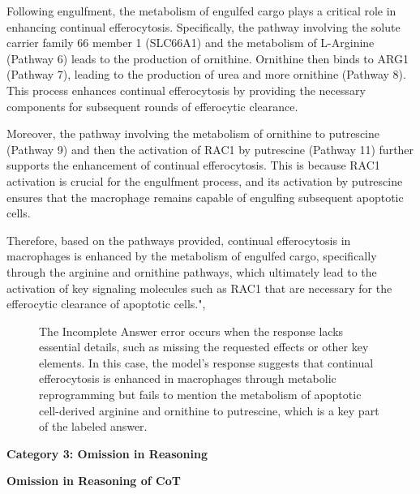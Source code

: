 \begin{tcolorbox}[breakable]
Following engulfment, the metabolism of engulfed cargo plays a critical role in enhancing continual efferocytosis. Specifically, the pathway involving the solute carrier family 66 member 1 (SLC66A1) and the metabolism of L-Arginine (Pathway 6) leads to the production of ornithine. Ornithine then binds to ARG1 (Pathway 7), leading to the production of urea and more ornithine (Pathway 8). This process enhances continual efferocytosis by providing the necessary components for subsequent rounds of efferocytic clearance.

Moreover, the pathway involving the metabolism of ornithine to putrescine (Pathway 9) and then the activation of RAC1 by putrescine (Pathway 11) further supports the enhancement of continual efferocytosis. This is because RAC1 activation is crucial for the engulfment process, and its activation by putrescine ensures that the macrophage remains capable of engulfing subsequent apoptotic cells.

Therefore, based on the pathways provided, continual efferocytosis in macrophages is enhanced by the metabolism of engulfed cargo, specifically through the arginine and ornithine pathways, which ultimately lead to the activation of key signaling molecules such as RAC1 that are necessary for the efferocytic clearance of apoptotic cells.",
\end{tcolorbox}
\begin{figure}[!h]
    \vspace{0.01cm}
    \caption{The Incomplete Answer error occurs when the response lacks essential details, such as missing the requested effects or other key elements. In this case, the model's response suggests that continual efferocytosis is enhanced in macrophages through metabolic reprogramming but fails to mention the metabolism of apoptotic cell-derived arginine and ornithine to putrescine, which is a key part of the labeled answer.}
\end{figure}

\textbf{Category 3: Omission in Reasoning}

\textbf{Omission in Reasoning of CoT}


